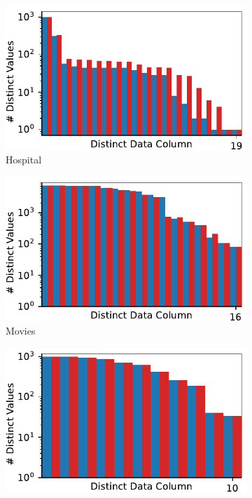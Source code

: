 \begin{figure}[!t]
\hfill
\begin{subfigure}{0.4\textwidth}
    \includegraphics[width=\textwidth]{figures/plot/distinct/hospital_distinct/combined.pdf}
    \caption{Hospital}
    \label{fig:distincts_hospitals}
\end{subfigure}
\hfill
\begin{subfigure}{0.4\textwidth}
    \includegraphics[width=\textwidth]{figures/plot/distinct/movies_distinct/combined.pdf}
    \caption{Movies}
    \label{exp:distincts_movies}
\end{subfigure}
\hfill
\begin{subfigure}{0.4\textwidth}
    \includegraphics[width=\textwidth]{figures/plot/distinct/rayyan_distinct/combined.pdf}

\end{subfigure}
\end{figure}

